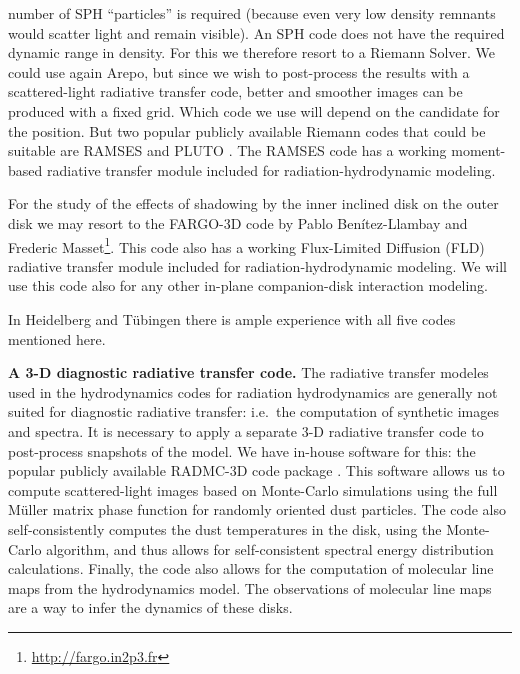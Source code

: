 \documentclass[10pt,fleqn,twoside]{article}
\begin{document}
\begin{compactenumerate}
\begin{compactitemize}
    number of SPH ``particles'' is required (because even very low density
    remnants would scatter light and remain visible). An SPH code does not
    have the required dynamic range in density. For this we therefore resort
    to a Riemann Solver. We could use again Arepo, but since we wish to
    post-process the results with a scattered-light radiative transfer code,
    better and smoother images can be produced with a fixed grid. Which code
    we use will depend on the candidate for the position. But two popular
    publicly available Riemann codes that could be suitable are RAMSES
    \citep{2002A&A...385..337T} and PLUTO \citep{2007ApJS..170..228M}. The
    RAMSES code has a working moment-based radiative transfer module
    included for radiation-hydrodynamic modeling.
  \item For the study of the effects of shadowing by the inner inclined disk
    on the outer disk we may resort to the FARGO-3D code by Pablo
    Ben\'itez-Llambay and Frederic
    Masset\footnote{\url{http://fargo.in2p3.fr}}. This code also has a
    working Flux-Limited Diffusion (FLD) radiative transfer module included
    for radiation-hydrodynamic modeling. We will use this code also for any
    other in-plane companion-disk interaction modeling.
  \end{compactitemize}
  In Heidelberg and T\"ubingen there is ample experience with all five codes
  mentioned here. 
\item {\bf A 3-D diagnostic radiative transfer code.} The radiative transfer
  modeles used in the hydrodynamics codes for radiation hydrodynamics are
  generally not suited for diagnostic radiative transfer: i.e.\ the
  computation of synthetic images and spectra. It is necessary to apply a
  separate 3-D radiative transfer code to post-process snapshots of the
  model. We have in-house software for this: the popular publicly available
  RADMC-3D code package \citep{2012ascl.soft02015D}. This software allows us
  to compute scattered-light images based on Monte-Carlo simulations using
  the full M\"uller matrix phase function for randomly oriented dust
  particles.  The code also self-consistently computes the dust temperatures
  in the disk, using the \citet{2001ApJ...554..615B} Monte-Carlo algorithm,
  and thus allows for self-consistent spectral energy distribution
  calculations.  Finally, the code also allows for the computation of
  molecular line maps from the hydrodynamics model. The observations of
  molecular line maps are a way to infer the dynamics of these disks.
\end{compactenumerate}
\end{document}
